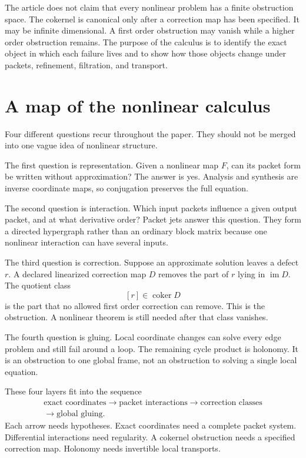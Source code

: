 \documentclass{aomart}
\theoremstyle{definition}
\theoremstyle{remark}
\newcommand{\im}{\operatorname{im}}
\newcommand{\coker}{\operatorname{coker}}
\begin{document}
The article does not claim that every nonlinear problem has a finite obstruction space.  The cokernel is canonical only after a correction map has been specified.  It may be infinite dimensional.  A first order obstruction may vanish while a higher order obstruction remains.  The purpose of the calculus is to identify the exact object in which each failure lives and to show how those objects change under packets, refinement, filtration, and transport.


\section{A map of the nonlinear calculus}\label{sec:map}

Four different questions recur throughout the paper.  They should not be merged into one vague idea of nonlinear structure.

The first question is representation.  Given a nonlinear map $F$, can its packet form be written without approximation?  The answer is yes.  Analysis and synthesis are inverse coordinate maps, so conjugation preserves the full equation.

The second question is interaction.  Which input packets influence a given output packet, and at what derivative order?  Packet jets answer this question.  They form a directed hypergraph rather than an ordinary block matrix because one nonlinear interaction can have several inputs.

The third question is correction.  Suppose an approximate solution leaves a defect $r$.  A declared linearized correction map $D$ removes the part of $r$ lying in $\im D$.  The quotient class
\[
[r]\in\coker D
\]
is the part that no allowed first order correction can remove.  This is the obstruction.  A nonlinear theorem is still needed after that class vanishes.

The fourth question is gluing.  Local coordinate changes can solve every edge problem and still fail around a loop.  The remaining cycle product is holonomy.  It is an obstruction to one global frame, not an obstruction to solving a single local equation.

These four layers fit into the sequence
\[
\begin{gathered}
\text{exact coordinates}
\longrightarrow
\text{packet interactions}
\longrightarrow
\text{correction classes}
\\
\longrightarrow
\text{global gluing}.
\end{gathered}
\]
Each arrow needs hypotheses.  Exact coordinates need a complete packet system.  Differential interactions need regularity.  A cokernel obstruction needs a specified correction map.  Holonomy needs invertible local transports.
\end{document}
